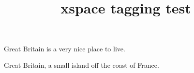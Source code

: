 \documentclass{article}
\title{xspace tagging test}
\newcommand{\gb}{Great Britain\xspace}
\begin{document}
\gb is a very nice place to live.

\gb, a small island off the coast of France.
\end{document}
